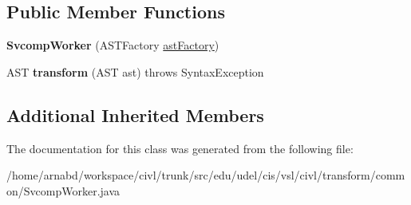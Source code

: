\subsection*{Public Member Functions}
\begin{DoxyCompactItemize}
\item 
\hypertarget{classedu_1_1udel_1_1cis_1_1vsl_1_1civl_1_1transform_1_1common_1_1SvcompWorker_a2da1d7bbdddf1107d743318499bf66cc}{}{\bfseries Svcomp\+Worker} (A\+S\+T\+Factory \hyperlink{classedu_1_1udel_1_1cis_1_1vsl_1_1civl_1_1transform_1_1common_1_1BaseWorker_a44812bb476e4511fb6ca29a808427186}{ast\+Factory})\label{classedu_1_1udel_1_1cis_1_1vsl_1_1civl_1_1transform_1_1common_1_1SvcompWorker_a2da1d7bbdddf1107d743318499bf66cc}

\item 
\hypertarget{classedu_1_1udel_1_1cis_1_1vsl_1_1civl_1_1transform_1_1common_1_1SvcompWorker_ae67e8a1c5cd324571cee11c5fffd3014}{}A\+S\+T {\bfseries transform} (A\+S\+T ast)  throws Syntax\+Exception \label{classedu_1_1udel_1_1cis_1_1vsl_1_1civl_1_1transform_1_1common_1_1SvcompWorker_ae67e8a1c5cd324571cee11c5fffd3014}

\end{DoxyCompactItemize}
\subsection*{Additional Inherited Members}


The documentation for this class was generated from the following file\+:\begin{DoxyCompactItemize}
\item 
/home/arnabd/workspace/civl/trunk/src/edu/udel/cis/vsl/civl/transform/common/Svcomp\+Worker.\+java\end{DoxyCompactItemize}
